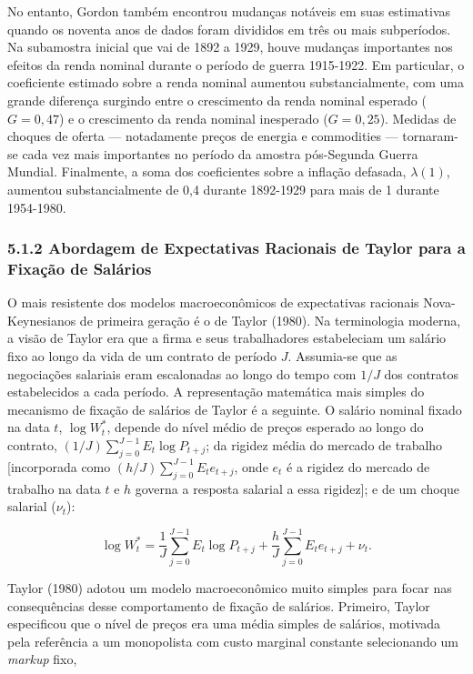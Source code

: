 \documentclass[12pt]{article}
\begin{document}
No entanto, Gordon também encontrou mudanças notáveis em suas estimativas quando os noventa anos de dados foram divididos em três ou mais subperíodos. Na subamostra inicial que vai de 1892 a 1929, houve mudanças importantes nos efeitos da renda nominal durante o período de guerra 1915-1922. Em particular, o coeficiente estimado sobre a renda nominal aumentou substancialmente, com uma grande diferença surgindo entre o crescimento da renda nominal esperado ($G = 0,47$) e o crescimento da renda nominal inesperado ($G = 0,25$). Medidas de choques de oferta — notadamente preços de energia e commodities — tornaram-se cada vez mais importantes no período da amostra pós-Segunda Guerra Mundial. Finalmente, a soma dos coeficientes sobre a inflação defasada, $\lambda(1)$, aumentou substancialmente de 0,4 durante 1892-1929 para mais de 1 durante 1954-1980.

\subsubsection{5.1.2 Abordagem de Expectativas Racionais de Taylor para a Fixação de Salários} O mais resistente dos modelos macroeconômicos de expectativas racionais Nova-Keynesianos de primeira geração é o de Taylor (1980). Na terminologia moderna, a visão de Taylor era que a firma e seus trabalhadores estabeleciam um salário fixo ao longo da vida de um contrato de período $J$. Assumia-se que as negociações salariais eram escalonadas ao longo do tempo com $1/J$ dos contratos estabelecidos a cada período. A representação matemática mais simples do mecanismo de fixação de salários de Taylor é a seguinte. O salário nominal fixado na data $t$, $\log W_t^*$, depende do nível médio de preços esperado ao longo do contrato, $(1/J) \sum_{j=0}^{J-1} E_t \log P_{t+j}$; da rigidez média do mercado de trabalho [incorporada como $(h/J) \sum_{j=0}^{J-1} E_t e_{t+j}$, onde $e_t$ é a rigidez do mercado de trabalho na data $t$ e $h$ governa a resposta salarial a essa rigidez]; e de um choque salarial ($\nu_t$):

\begin{equation}
\log W_t^* = \frac{1}{J} \sum_{j=0}^{J-1} E_t \log P_{t+j} + \frac{h}{J} \sum_{j=0}^{J-1} E_t e_{t+j} + \nu_t. \tag{5.2}
\end{equation}

Taylor (1980) adotou um modelo macroeconômico muito simples para focar nas consequências desse comportamento de fixação de salários. Primeiro, Taylor especificou que o nível de preços era uma média simples de salários, motivada pela referência a um monopolista com custo marginal constante selecionando um \textit{markup} fixo,
\end{document}
